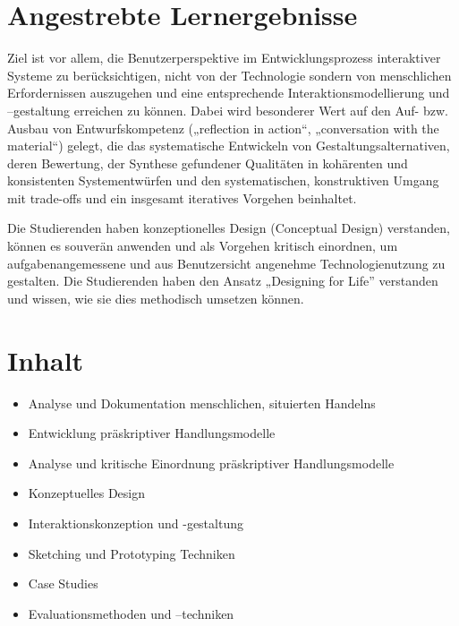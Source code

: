 \section*{Angestrebte
Lernergebnisse\label{/mi-2017/modulbeschreibungen-master/MA_HCI_InteractionDesign}}\label{angestrebte-lernergebnissepathlabelmi-2017modulbeschreibungen-mastermaux5fhciux5finteractiondesign}

Ziel ist vor allem, die Benutzerperspektive im Entwicklungsprozess
interaktiver Systeme zu berücksichtigen, nicht von der Technologie
sondern von menschlichen Erfordernissen auszugehen und eine
entsprechende Interaktionsmodellierung und --gestaltung erreichen zu
können. Dabei wird besonderer Wert auf den Auf- bzw. Ausbau von
Entwurfskompetenz („reflection in action``, „conversation with the
material``) gelegt, die das systematische Entwickeln von
Gestaltungsalternativen, deren Bewertung, der Synthese gefundener
Qualitäten in kohärenten und konsistenten Systementwürfen und den
systematischen, konstruktiven Umgang mit trade-offs und ein insgesamt
iteratives Vorgehen beinhaltet.

Die Studierenden haben konzeptionelles Design (Conceptual Design)
verstanden, können es souverän anwenden und als Vorgehen kritisch
einordnen, um aufgabenangemessene und aus Benutzersicht angenehme
Technologienutzung zu gestalten. Die Studierenden haben den Ansatz
„Designing for Life'' verstanden und wissen, wie sie dies methodisch
umsetzen können.

\section*{Inhalt\label{/mi-2017/modulbeschreibungen-master/MA_HCI_InteractionDesign}}\label{inhaltpathlabelmi-2017modulbeschreibungen-mastermaux5fhciux5finteractiondesign}

\begin{itemize}
\tightlist
\item
  Analyse und Dokumentation menschlichen, situierten Handelns
\item
  Entwicklung präskriptiver Handlungsmodelle
\item
  Analyse und kritische Einordnung präskriptiver Handlungsmodelle
\item
  Konzeptuelles Design
\item
  Interaktionskonzeption und -gestaltung
\item
  Sketching und Prototyping Techniken
\item
  Case Studies
\item
  Evaluationsmethoden und --techniken
\end{itemize}

